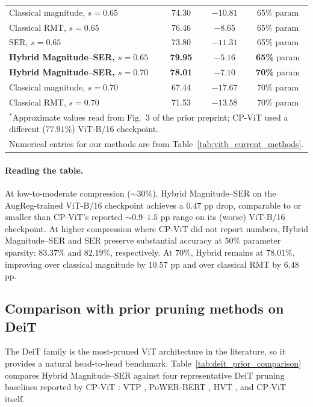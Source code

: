 \documentclass[11pt]{article}
\theoremstyle{plain}
\theoremstyle{definition}
\theoremstyle{remark}
\newcommand{\1}{\mathbf{1}}
\begin{document}
\begin{table}[ht]
\begin{tabular}{lccc}
Classical magnitude, \(s=0.65\)               & 74.30 & \(-10.81\) & 65\% param \\
Classical RMT, \(s=0.65\)                     & 76.46 & \(-8.65\) & 65\% param \\
SER, \(s=0.65\)                               & 73.80 & \(-11.31\) & 65\% param \\
\textbf{Hybrid Magnitude--SER, \(s=0.65\)}     & \textbf{79.95} & \(\boldsymbol{-5.16}\) & \textbf{65\%} param \\
\textbf{Hybrid Magnitude--SER, \(s=0.70\)}     & \textbf{78.01} & \(\boldsymbol{-7.10}\) & \textbf{70\%} param \\
Classical magnitude, \(s=0.70\)               & 67.44 & \(-17.67\) & 70\% param \\
Classical RMT, \(s=0.70\)                     & 71.53 & \(-13.58\) & 70\% param \\
\bottomrule
\multicolumn{4}{l}{\footnotesize $^\ast$Approximate values read from Fig.~3 of the prior preprint; CP-ViT used a different (\(77.91\%\)) ViT-B/16 checkpoint.} \\
\multicolumn{4}{l}{\footnotesize Numerical entries for our methods are from Table~\ref{tab:vitb_current_methods}.} \\
\end{tabular}
\end{table}

\paragraph{Reading the table.}
At low-to-moderate compression (\(\sim 30\%\)), Hybrid Magnitude--SER on the AugReg-trained ViT-B/16 checkpoint achieves a \(0.47\) pp drop, comparable to or smaller than CP-ViT's reported \(\sim 0.9\)--\(1.5\) pp range on its (worse) ViT-B/16 checkpoint.  At higher compression where CP-ViT did not report numbers, Hybrid Magnitude--SER and SER preserve substantial accuracy at \(50\%\) parameter sparsity: \(83.37\%\) and \(82.19\%\), respectively.  At \(70\%\), Hybrid remains at \(78.01\%\), improving over classical magnitude by \(10.57\) pp and over classical RMT by \(6.48\) pp.

\subsection{Comparison with prior pruning methods on DeiT}
\label{subsec:deit_prior_comparison}

The DeiT family is the most-pruned ViT architecture in the literature, so it provides a natural head-to-head benchmark.  Table~\ref{tab:deit_prior_comparison} compares Hybrid Magnitude--SER against four representative DeiT pruning baselines reported by CP-ViT \cite{song2022cp}: VTP \cite{zhu2021visual}, PoWER-BERT \cite{goyal2020powerbert}, HVT \cite{pan2021scalable}, and CP-ViT itself.
\end{document}
